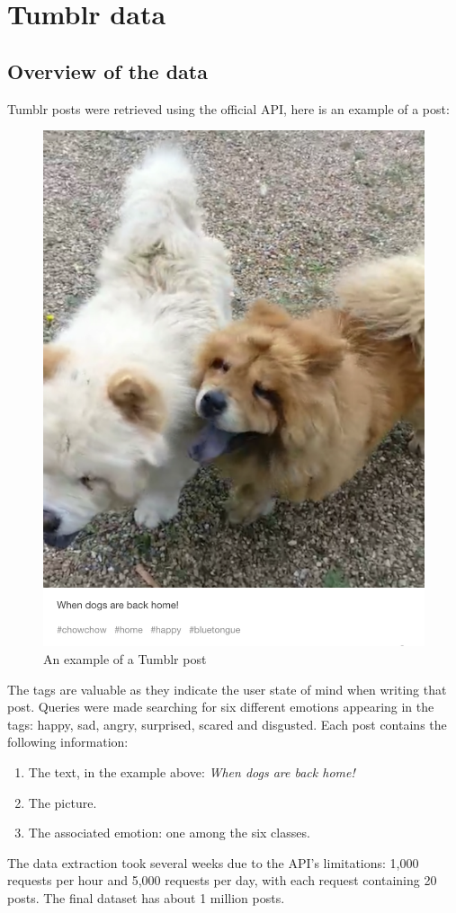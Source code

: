 \chapter{Tumblr data}

\section{Overview of the data}
Tumblr posts were retrieved using the official API, here is an example of a post:
\begin{figure}[H]
\centering
\includegraphics[width=.58\textwidth]{Images/chowchow.png}
\caption{An example of a Tumblr post}
\end{figure}

The tags are valuable as they indicate the user state of mind when writing that post. Queries were made searching for six different emotions appearing in the tags: happy, sad, angry, surprised, scared and disgusted. Each post contains the following information:
\begin{enumerate}
\item The text, in the example above: \textit{When dogs are back home!}
\item The picture.
\item The associated emotion: one among the six classes.
\end{enumerate}

The data extraction took several weeks due to the API's limitations: 1,000 requests per hour and 5,000 requests per day, with each request containing 20 posts. The final dataset has about 1 million posts.

